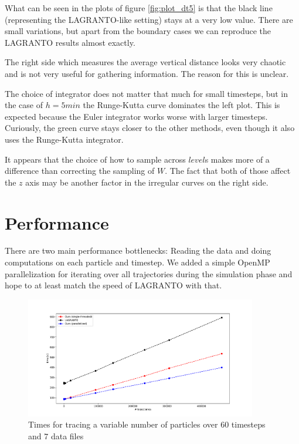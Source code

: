 What can be seen in the plots of figure \ref{fig:plot_dt5} is that the black line (representing the LAGRANTO-like setting) stays at a very low value. There are small variations, but apart from the boundary cases we can reproduce the LAGRANTO results almost exactly.

The right side which measures the average vertical distance looks very chaotic and is not very useful for gathering information. The reason for this is unclear.

The choice of integrator does not matter that much for small timesteps, but in the case of $h = 5 min$ the Runge-Kutta curve dominates the left plot. This is expected because the Euler integrator works worse with larger timesteps. Curiously, the green curve stays closer to the other methods, even though it also uses the Runge-Kutta integrator.

It appears that the choice of how to sample across $level$s makes more of a difference than correcting the sampling of $W$. The fact that both of those affect the $z$ axis may be another factor in the irregular curves on the right side.

\section{Performance}

There are two main performance bottlenecks: Reading the data and doing computations on each particle and timestep. We added a simple OpenMP parallelization for iterating over all trajectories during the simulation phase and hope to at least match the speed of LAGRANTO with that.

\begin{figure}
\centering \includegraphics*[width=0.9\textwidth]{figures/plot_times}
\caption{Times for tracing a variable number of particles over $60$ timesteps and $7$ data files}
\label{fig:plot_time}
\end{figure}

